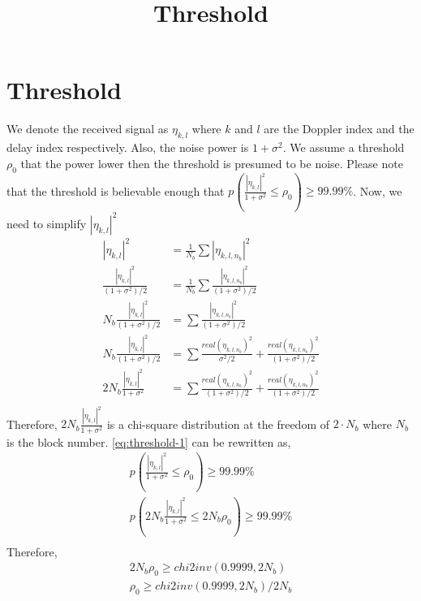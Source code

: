 \documentclass{article}
\title{Threshold}
\author{}
\date{}
\begin{document}
\maketitle

\section*{Threshold}
We denote the received signal as $\eta_{k,l}$ where $k$ and $l$ are the Doppler index and the delay index respectively. Also, the noise power is $1+\sigma^2$. We assume a threshold $\rho_0$ that the power lower then the threshold is presumed to be noise. Please note that the threshold is believable enough that $p(\frac{|\eta_{k,l}|^2}{1+\sigma^2} \leq \rho_0) \geq 99.99\%$.
Now, we need to simplify $|\eta_{k,l}|^2$
\begin{equation}
\begin{split}
|\eta_{k,l}|^2 &= \frac{1}{N_b}\sum |\eta_{k,l,n_b}|^2 \\
\frac{|\eta_{k,l}|^2 }{(1+\sigma^2)/2} &= \frac{1}{N_b}\sum \frac{|\eta_{k,l,n_b}|^2 }{(1+\sigma^2)/2}\\
N_b\frac{|\eta_{k,l}|^2 }{(1+\sigma^2)/2} &= \sum \frac{|\eta_{k,l,n_b}|^2 }{(1+\sigma^2)/2}\\
N_b\frac{|\eta_{k,l}|^2 }{(1+\sigma^2)/2} &= \sum \frac{real(\eta_{k,l,n_b})^2 }{\sigma^2/2} + \frac{real(\eta_{k,l,n_b})^2 }{(1+\sigma^2)/2}\\ 
2N_b\frac{|\eta_{k,l}|^2 }{1+\sigma^2} &= \sum \frac{real(\eta_{k,l,n_b})^2 }{(1+\sigma^2)/2} + \frac{real(\eta_{k,l,n_b})^2 }{(1+\sigma^2)/2}\\ 
\end{split}
\label{eq:threshold-1}
\end{equation}
Therefore, $2N_b\frac{|\eta_{k,l}|^2 }{1+\sigma^2}$ is a chi-square distribution at the freedom of $2\cdot N_b$ where $N_b$ is the block number. \eqref{eq:threshold-1} can be rewritten as,
\begin{equation}
\begin{split}
p(\frac{|\eta_{k,l}|^2}{1+\sigma^2} \leq \rho_0) \geq 99.99\% \\
p(2N_b\frac{|\eta_{k,l}|^2}{1+\sigma^2} \leq 2N_b\rho_0) \geq 99.99\% \\
\end{split}
\end{equation}
Therefore, 
\begin{equation}
\begin{split}
2N_b\rho_0 \geq chi2inv(0.9999, 2N_b)\\
\rho_0 \geq chi2inv(0.9999, 2N_b)/2N_b
\end{split}
\end{equation}
\end{document}
